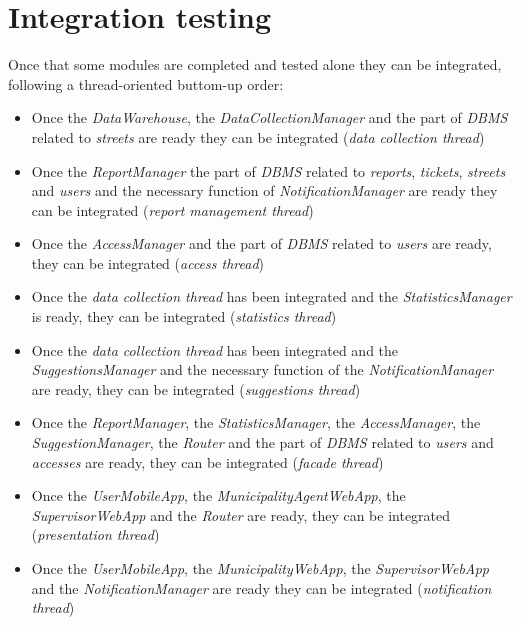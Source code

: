 \documentclass[a4paper]{report}
\begin{document}
\section{Integration testing}
Once that some modules are completed and tested alone they can be integrated, following a thread-oriented buttom-up order:
\begin{itemize}
\item Once the \textit{DataWarehouse}, the \textit{DataCollectionManager} and the part of \textit{DBMS} related to \textit{streets} are ready they can be integrated (\textit{data collection thread})
\item Once the \textit{ReportManager} the part of \textit{DBMS} related to \textit{reports}, \textit{tickets}, \textit{streets} and \textit{users} and the necessary function of \textit{NotificationManager} are ready they can be integrated  (\textit{report management thread})
\item Once the \textit{AccessManager} and the part of \textit{DBMS} related to \textit{users} are ready, they can be integrated (\textit{access thread})
\item Once the \textit{data collection thread} has been integrated and the \textit{StatisticsManager} is ready, they can be integrated  (\textit{statistics thread})
\item Once the \textit{data collection thread} has been integrated and the \textit{SuggestionsManager} and the necessary function of the \textit{NotificationManager} are ready, they can be integrated (\textit{suggestions thread})
\item Once the \textit{ReportManager}, the \textit{StatisticsManager}, the \textit{AccessManager}, the \textit{SuggestionManager}, the \textit{Router} and the part of \textit{DBMS} related to \textit{users} and \textit{accesses} are ready, they can be integrated (\textit{facade thread})
\item Once the \textit{UserMobileApp}, the \textit{MunicipalityAgentWebApp}, the \textit{SupervisorWebApp} and the \textit{Router} are ready, they can be integrated (\textit{presentation thread})
\item Once the \textit{UserMobileApp}, the \textit{MunicipalityWebApp}, the \textit{SupervisorWebApp} and the \textit{NotificationManager} are ready they can be integrated (\textit{notification thread})
\end{itemize}
\end{document}
